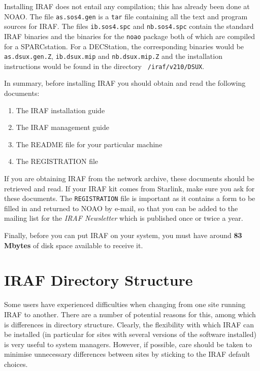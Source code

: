 Installing IRAF does not entail any compilation; this has already been
done at NOAO. The file {\tt as.sos4.gen} is a {\tt tar} file containing all
the text and program sources for IRAF. The files {\tt ib.sos4.spc} and
{\tt nb.sos4.spc} contain the standard IRAF binaries and the binaries
for the {\tt noao} package both of which are compiled for a
SPARCstation.  For a DECStation, the corresponding binaries would be
{\tt as.dsux.gen.Z}, {\tt ib.dsux.mip} and {\tt nb.dsux.mip.Z} and the
installation instructions would be found in the directory {\tt
/iraf/v210/DSUX}.

In summary, before installing IRAF you should obtain and read the
following documents:

\begin{enumerate}
\item{The IRAF installation guide}

\item{The IRAF management guide}

\item{The README file for your particular machine}

\item{The REGISTRATION file}

\end{enumerate}

If you are obtaining IRAF from the network archive, these documents
should be retrieved and read.  If your IRAF kit comes from Starlink,
make sure you ask for these documents. The
{\tt REGISTRATION} file is important as it
contains a form to be filled in and returned to NOAO by e-mail, so that
you can be added to the mailing list for the {\it IRAF Newsletter}\/ which is
published once or twice a year.

Finally, before you can put IRAF on your system, you must have around
{\bf 83\,Mbytes} of disk space available to receive it.

\section{IRAF Directory Structure}

Some users have experienced difficulties when changing from one site running
IRAF to another. There are a number of potential reasons for this, among which
is differences in directory structure. Clearly, the flexibility with which
IRAF can be installed (in particular for sites with several versions of the
software installed) is very useful to system managers. However, if possible,
care should be taken to minimise unnecessary differences between sites by
sticking to the IRAF default choices.

